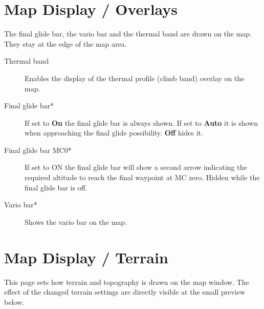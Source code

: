 \section{Map Display / Overlays}

The final glide bar, the vario bar and the thermal band are drawn on
the map. They stay at the edge of the map area.

\begin{description}
\item[Thermal band] \label{conf:thermalband} Enables the display of the
  thermal profile (climb band) overlay on the map.
\item[Final glide bar*]  If set to {\bf On} the final glide bar is always
  shown. If set to {\bf Auto} it is shown when approaching the final glide
  possibility. {\bf Off} hides it.
\item[Final glide bar MC0*]  If set to ON the final glide bar will show a second arrow
  indicating the required altitude to reach the final waypoint at MC zero.
  Hidden while the final glide bar is off.
\item[Vario bar*]  Shows the vario bar on the map.
\end{description}


\section{Map Display / Terrain}\label{sec:terrain-display}

This page sets how terrain and topography is drawn on the map window. The effect of the 
changed terrain settings are directly visible at the small preview below.

